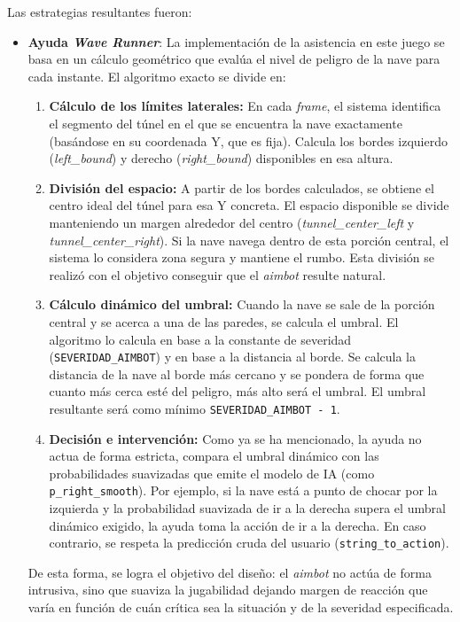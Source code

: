 Las estrategias resultantes fueron:

\begin{itemize}
    \item \textbf{Ayuda \textit{Wave Runner}}: La implementación de la asistencia en este juego se basa en un cálculo geométrico que evalúa el nivel de peligro de la nave para cada instante. El algoritmo exacto se divide en:
    \begin{enumerate}
        \item \textbf{Cálculo de los límites laterales:} En cada \textit{frame}, el sistema identifica el segmento del túnel en el que se encuentra la nave exactamente (basándose en su coordenada Y, que es fija). Calcula los bordes izquierdo (\textit{left\_bound}) y derecho (\textit{right\_bound}) disponibles en esa altura.
        \item \textbf{División del espacio:} A partir de los bordes calculados, se obtiene el centro ideal del túnel para esa Y concreta. El espacio disponible se divide manteniendo un margen alrededor del centro (\textit{tunnel\_center\_left} y \textit{tunnel\_center\_right}). Si la nave navega dentro de esta porción central, el sistema lo considera zona segura y mantiene el rumbo. Esta división se realizó con el objetivo conseguir que el \textit{aimbot} resulte natural.
        \item \textbf{Cálculo dinámico del umbral:} Cuando la nave se sale de la porción central y se acerca a una de las paredes, se calcula el umbral. El algoritmo lo calcula en base a la constante de severidad (\texttt{SEVERIDAD\_AIMBOT}) y en base a la distancia al borde. Se calcula la distancia de la nave al borde más cercano y se pondera de forma que cuanto más cerca esté del peligro, más alto será el umbral. El umbral resultante será como mínimo \texttt{SEVERIDAD\_AIMBOT - 1}.
        \item \textbf{Decisión e intervención:} Como ya se ha mencionado, la ayuda no actua de forma estricta, compara el umbral dinámico con las probabilidades suavizadas que emite el modelo de IA (como \texttt{p\_right\_smooth}). Por ejemplo, si la nave está a punto de chocar por la izquierda y la probabilidad suavizada de ir a la derecha supera el umbral dinámico exigido, la ayuda toma la acción de ir a la derecha. En caso contrario, se respeta la predicción cruda del usuario (\texttt{string\_to\_action}).
    \end{enumerate}
    De esta forma, se logra el objetivo del diseño: el \textit{aimbot} no actúa de forma intrusiva, sino que suaviza la jugabilidad dejando margen de reacción que varía en función de cuán crítica sea la situación y de la severidad especificada.

\end{itemize}
